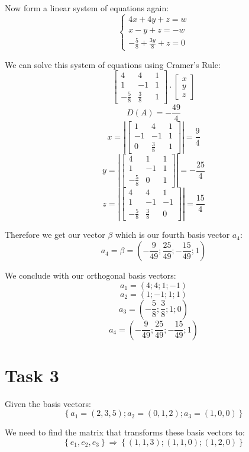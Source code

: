 \documentclass[11pt]{article}
\begin{document}
Now form a linear system of equations again:
\[
\left\{
\begin{aligned}
4x + 4y + z = w \\
x-y+z=-w \\
-\frac{5}{8}+\frac{3y}{8}+z=0
\end{aligned}
\]

We can solve this system of equations using Cramer's Rule:
\[
\begin{bmatrix}
4 & 4 & 1 \\
1 & -1 & 1 \\
-\frac{5}{8} & \frac{3}{8} & 1
\end{bmatrix}
\cdot
\begin{bmatrix}
x \\ y \\ z 
\end{bmatrix}
\]
\[
D(A) = -\frac{49}{4}
\]
\[
x = \left|
\begin{bmatrix}
1 & 4 & 1 \\
-1 & -1 & 1 \\
0 & \frac{3}{8} & 1
\end{bmatrix}
\right| = \frac{9}{4}
\]
\[
y = \left|
\begin{bmatrix}
4 & 1 & 1 \\
1 & -1 & 1 \\
-\frac{5}{8} & 0 & 1
\end{bmatrix}
\right| = -\frac{25}{4}
\]
\[
z = \left|
\begin{bmatrix}
4 & 4 & 1 \\
1 & -1 & -1 \\
-\frac{5}{8} & \frac{3}{8} & 0
\end{bmatrix}
\right| = \frac{15}{4}
\]

Therefore we get our vector $\beta$ which is our fourth basis vector $a_4$:
\[
a_4 = \beta = \left( -\frac{9}{49} ; \frac{25}{49} ; -\frac{15}{49} ; 1 \right)
\]

We conclude with our orthogonal basis vectors:
\[
a_1 = (4;4;1;-1)
\]
\[
a_2 = (1;-1;1;1)
\]
\[
a_3 = (-\frac{5}{8};\frac{3}{8};1;0)
\]
\[
a_4 = (-\frac{9}{49};\frac{25}{49};-\frac{15}{49};1) 
\]
\section{Task 3}
\label{sec:org373321a}
Given the basis vectors:
\[
\left\{ a_1 = (2,3,5); a_2 = (0,1,2); a_3 = (1,0,0) \right\}
\]

We need to find the matrix that transforms these basis vectors to:
\[
\left\{ e_1, e_2, e_3 \right\} \Rightarrow \left\{ (1,1,3); (1,1,0); (1,2,0) \right\}
\]
\end{document}
